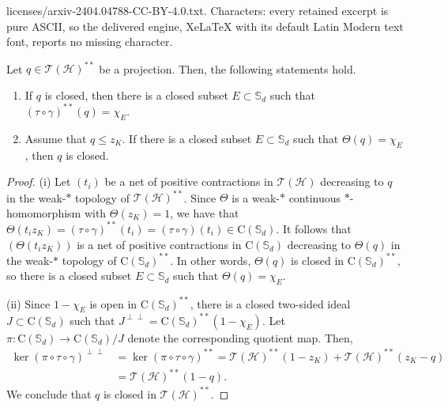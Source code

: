 \documentclass[10pt,a4paper]{amsart}
\newcommand{\T}{{\mathcal{T}}}
\newcommand{\bS}{{\mathbb{S}}}
\newcommand{\rC}{\mathrm{C}}
\renewcommand{\H}{{\mathcal{H}}}
\begin{document}
licenses/arxiv-2404.04788-CC-BY-4.0.txt. Characters: every retained excerpt is pure ASCII, so the delivered engine, XeLaTeX with its default Latin Modern text font, reports no missing character.
\begin{lemma}\label{L:closedsetproj}
Let $q\in \T(\H)^{**}$ be a projection. Then, the following statements hold.
\begin{enumerate}[{\rm (i)}]
\item 
 If $q$ is closed, then there is a closed subset $E\subset \bS_d$ such that $(\tau\circ \gamma)^{**}(q)=\chi_E$.
\item Assume that $q\leq z_K$. If  there is a closed subset $E\subset \bS_d$ such that $\Theta(q)=\chi_E$, then $q$ is closed.
\end{enumerate}
\end{lemma}

\begin{proof}
(i) Let $(t_i)$ be a net of positive contractions in $\T(\H)$ decreasing to $q$ in the weak-$*$ topology of $\T(\H)^{**}$. Since $\Theta$ is a weak-$*$ continuous $*$-homomorphism 
with $\Theta(z_K) = 1$,  
we have that $\Theta(t_i z_K) = (\tau\circ \gamma)^{**}(t_i) =( \tau\circ \gamma)(t_i) \in \rC(\bS_d)$.
It follows that $(\Theta(t_i z_K) )$ is a  net of positive contractions in $\rC(\bS_d)$ decreasing to $\Theta(q)$ in the weak-$*$ topology of $\rC(\bS_d)^{**}$. In other words, $\Theta(q)$ is closed in $\rC(\bS_d)^{**}$, so  there is a closed subset $E\subset \bS_d$ such that $\Theta(q)=\chi_E$.
 
 
(ii) Since $1-\chi_E$ is open in $\rC(\bS_d)^{**}$, there is a closed two-sided ideal $J\subset \rC(\bS_d)$ such that $J^{\perp\perp}=\rC(\bS_d)^{**}(1-\chi_E)$. Let $\pi:\rC(\bS_d)\to \rC(\bS_d)/J$ denote the corresponding quotient map. 
Then,
\begin{align*}
\ker(\pi\circ \tau\circ \gamma)^{\perp\perp}&=\ker(\pi\circ \tau\circ \gamma)^{**}=\T(\H)^{**}(1-z_K)+\T(\H)^{**}(z_K-q)\\
&=\T(\H)^{**}(1-q).
\end{align*}
We conclude that $q$  is closed in $\T(\H)^{**}$. 
\end{proof}
\end{document}
